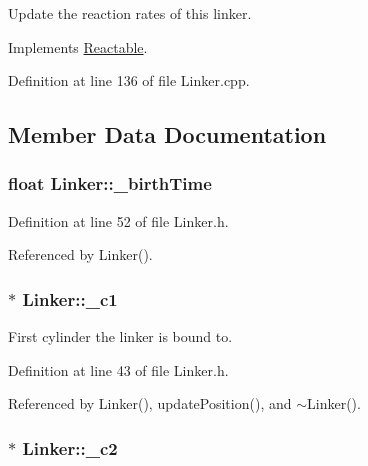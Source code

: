 Update the reaction rates of this linker. 



Implements \hyperlink{classReactable_a351e4c2d8891271c46fbbb0103b62619}{Reactable}.



Definition at line 136 of file Linker.\+cpp.



\subsection{Member Data Documentation}
\hypertarget{classLinker_a5bfc4496cdcfd43db3c801349ae16b74}{
\subsubsection[{\+\_\+birth\+Time}]{\setlength{\rightskip}{0pt plus 5cm}float Linker\+::\+\_\+birth\+Time\hspace{0.3cm}{\ttfamily [private]}}}\label{classLinker_a5bfc4496cdcfd43db3c801349ae16b74}


Definition at line 52 of file Linker.\+h.



Referenced by Linker().

\hypertarget{classLinker_ae73f608f5ffd4098f7191de6ba504680}{
\subsubsection[{\+\_\+c1}]{$\ast$ Linker\+::\+\_\+c1\hspace{0.3cm}{\ttfamily [private]}}}\label{classLinker_ae73f608f5ffd4098f7191de6ba504680}


First cylinder the linker is bound to. 



Definition at line 43 of file Linker.\+h.



Referenced by Linker(), update\+Position(), and $\sim$\+Linker().

\hypertarget{classLinker_a60b5cefe855173c410cb4471cd85d14f}{
\subsubsection[{\+\_\+c2}]{$\ast$ Linker\+::\+\_\+c2\hspace{0.3cm}{\ttfamily [private]}}}\label{classLinker_a60b5cefe855173c410cb4471cd85d14f}



